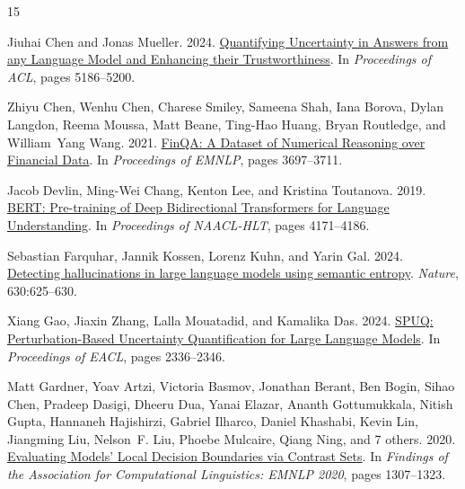 \begin{thebibliography}{15}
\providecommand{\natexlab}[1]{#1}

Jiuhai Chen and Jonas Mueller. 2024.
\newblock \href {https://aclanthology.org/2024.acl-long.283/} {{Quantifying
  Uncertainty in Answers from any Language Model and Enhancing their
  Trustworthiness}}.
\newblock In \emph{Proceedings of ACL}, pages 5186--5200.

Zhiyu Chen, Wenhu Chen, Charese Smiley, Sameena Shah, Iana Borova, Dylan
  Langdon, Reema Moussa, Matt Beane, Ting-Hao Huang, Bryan Routledge, and
  William~Yang Wang. 2021.
\newblock \href {https://aclanthology.org/2021.emnlp-main.300/} {{FinQA: A
  Dataset of Numerical Reasoning over Financial Data}}.
\newblock In \emph{Proceedings of EMNLP}, pages 3697--3711.

Jacob Devlin, Ming-Wei Chang, Kenton Lee, and Kristina Toutanova. 2019.
\newblock \href {https://aclanthology.org/N19-1423/} {{BERT: Pre-training of
  Deep Bidirectional Transformers for Language Understanding}}.
\newblock In \emph{Proceedings of NAACL-HLT}, pages 4171--4186.

Sebastian Farquhar, Jannik Kossen, Lorenz Kuhn, and Yarin Gal. 2024.
\newblock \href {https://www.nature.com/articles/s41586-024-07421-0}
  {{Detecting hallucinations in large language models using semantic entropy}}.
\newblock \emph{Nature}, 630:625--630.

Xiang Gao, Jiaxin Zhang, Lalla Mouatadid, and Kamalika Das. 2024.
\newblock \href {https://aclanthology.org/2024.eacl-long.143/} {{SPUQ:
  Perturbation-Based Uncertainty Quantification for Large Language Models}}.
\newblock In \emph{Proceedings of EACL}, pages 2336--2346.

Matt Gardner, Yoav Artzi, Victoria Basmov, Jonathan Berant, Ben Bogin, Sihao
  Chen, Pradeep Dasigi, Dheeru Dua, Yanai Elazar, Ananth Gottumukkala, Nitish
  Gupta, Hannaneh Hajishirzi, Gabriel Ilharco, Daniel Khashabi, Kevin Lin,
  Jiangming Liu, Nelson~F. Liu, Phoebe Mulcaire, Qiang Ning, and 7 others.
  2020.
\newblock \href {https://aclanthology.org/2020.findings-emnlp.117/}
  {{Evaluating Models' Local Decision Boundaries via Contrast Sets}}.
\newblock In \emph{Findings of the Association for Computational Linguistics:
  EMNLP 2020}, pages 1307--1323.


\end{thebibliography}
